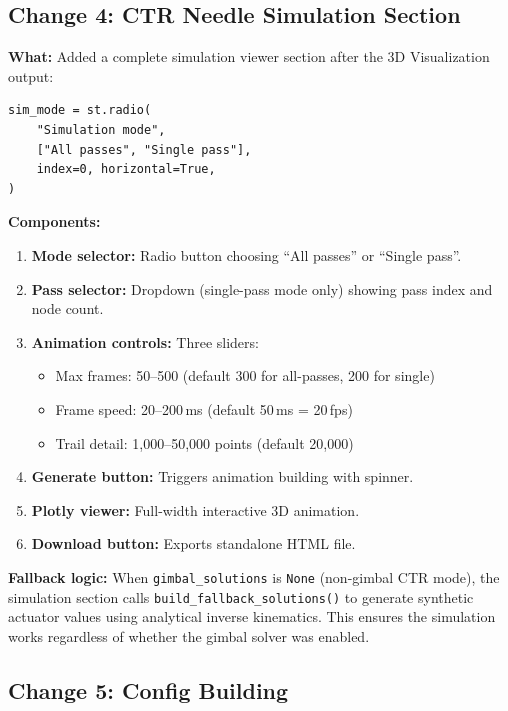 \documentclass[11pt,a4paper]{article}
\newcommand{\funcname}[1]{\texttt{\textcolor{codepurple}{#1}}}
\begin{document}
\subsection{Change 4: CTR Needle Simulation Section}

\textbf{What:} Added a complete simulation viewer section after the 3D Visualization output:

\begin{lstlisting}
sim_mode = st.radio(
    "Simulation mode",
    ["All passes", "Single pass"],
    index=0, horizontal=True,
)
\end{lstlisting}

\textbf{Components:}
\begin{enumerate}[nosep]
    \item \textbf{Mode selector:} Radio button choosing ``All passes'' or ``Single pass''.
    \item \textbf{Pass selector:} Dropdown (single-pass mode only) showing pass index and node count.
    \item \textbf{Animation controls:} Three sliders:
    \begin{itemize}[nosep]
        \item Max frames: 50--500 (default 300 for all-passes, 200 for single)
        \item Frame speed: 20--200\,ms (default 50\,ms = 20\,fps)
        \item Trail detail: 1,000--50,000 points (default 20,000)
    \end{itemize}
    \item \textbf{Generate button:} Triggers animation building with spinner.
    \item \textbf{Plotly viewer:} Full-width interactive 3D animation.
    \item \textbf{Download button:} Exports standalone HTML file.
\end{enumerate}

\textbf{Fallback logic:} When \texttt{gimbal\_solutions} is \texttt{None} (non-gimbal CTR mode), the simulation section calls \funcname{build\_fallback\_solutions()} to generate synthetic actuator values using analytical inverse kinematics. This ensures the simulation works regardless of whether the gimbal solver was enabled.

\subsection{Change 5: Config Building}
\end{document}
